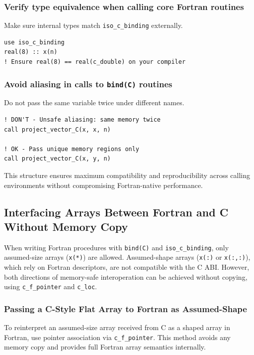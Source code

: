 \documentclass{article}
\begin{document}
\subsubsection{Verify type equivalence when calling core Fortran routines}

Make sure internal types match \texttt{iso\_c\_binding} externally.

\begin{verbatim}
use iso_c_binding
real(8) :: x(n)
! Ensure real(8) == real(c_double) on your compiler
\end{verbatim}

\subsubsection{Avoid aliasing in calls to \texttt{bind(C)} routines}

Do not pass the same variable twice under different names.

\begin{verbatim}
! DON'T - Unsafe aliasing: same memory twice
call project_vector_C(x, x, n)

! OK - Pass unique memory regions only
call project_vector_C(x, y, n)
\end{verbatim}

This structure ensures maximum compatibility and reproducibility across calling environments without compromising Fortran-native performance.

\subsection{Interfacing Arrays Between Fortran and C Without Memory Copy}

When writing Fortran procedures with \texttt{bind(C)} and \texttt{iso\_c\_binding}, only assumed-size arrays (\texttt{x(*)}) are allowed. Assumed-shape arrays (\texttt{x(:)} or \texttt{x(:,:)}), which rely on Fortran descriptors, are not compatible with the C ABI. However, both directions of memory-safe interoperation can be achieved without copying, using \texttt{c\_f\_pointer} and \texttt{c\_loc}.

\subsubsection{Passing a C-Style Flat Array to Fortran as Assumed-Shape}

To reinterpret an assumed-size array received from C as a shaped array in Fortran, use pointer association via \texttt{c\_f\_pointer}. This method avoids any memory copy and provides full Fortran array semantics internally.
\end{document}
